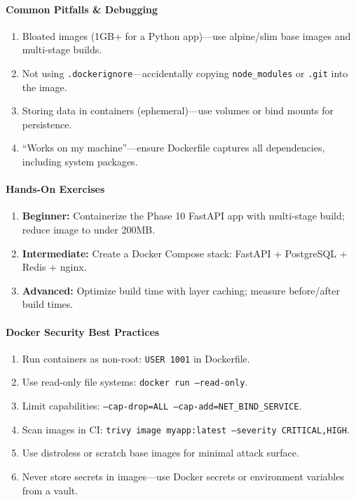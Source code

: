 \documentclass[11pt, a4paper, oneside]{report}
\begin{document}
\paragraph{Common Pitfalls \& Debugging}
\begin{enumerate}[leftmargin=*]
\item Bloated images (1GB+ for a Python app)---use alpine/slim base images and multi-stage builds.
\item Not using \texttt{.dockerignore}---accidentally copying \texttt{node\_modules} or \texttt{.git} into the image.
\item Storing data in containers (ephemeral)---use volumes or bind mounts for persistence.
\item ``Works on my machine''---ensure Dockerfile captures all dependencies, including system packages.
\end{enumerate}

\paragraph{Hands-On Exercises}
\begin{enumerate}[leftmargin=*]
\item \textbf{Beginner:} Containerize the Phase 10 FastAPI app with multi-stage build; reduce image to under 200MB.
\item \textbf{Intermediate:} Create a Docker Compose stack: FastAPI + PostgreSQL + Redis + nginx.
\item \textbf{Advanced:} Optimize build time with layer caching; measure before/after build times.
\end{enumerate}


\paragraph{Docker Security Best Practices}
\begin{enumerate}[leftmargin=*]
\item Run containers as non-root: \texttt{USER 1001} in Dockerfile.
\item Use read-only file systems: \texttt{docker run --read-only}.
\item Limit capabilities: \texttt{--cap-drop=ALL --cap-add=NET\_BIND\_SERVICE}.
\item Scan images in CI: \texttt{trivy image myapp:latest --severity CRITICAL,HIGH}.
\item Use distroless or scratch base images for minimal attack surface.
\item Never store secrets in images---use Docker secrets or environment variables from a vault.
\end{enumerate}
\end{document}
